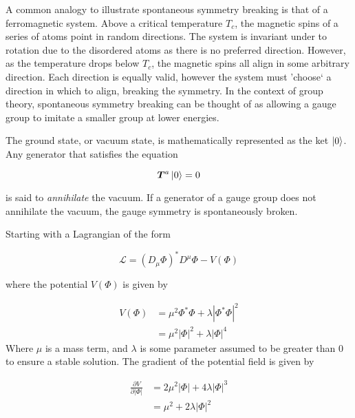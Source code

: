 \documentclass{article}
\begin{document}
A common analogy to illustrate spontaneous symmetry breaking is that of a ferromagnetic system. Above a critical temperature $T_c$, the magnetic spins of a series of atoms point in random directions. The system is invariant under to rotation due to the disordered atoms as there is no preferred direction. However, as the temperature drops below $T_c$, the magnetic spins all align in some arbitrary direction. Each direction is equally valid, however the system must 'choose` a direction in which to align, breaking the symmetry. In the context of group theory, spontaneous symmetry breaking can be thought of as allowing a gauge group to imitate a smaller group at lower energies.

The ground state, or vacuum state, is mathematically represented as the ket $\ket{0}$. Any generator that satisfies the equation

\begin{equation}
\bm{T}^a\ket{0} = 0
\end{equation}

is said to \textit{annihilate} the vacuum. If a generator of a gauge group does not annihilate the vacuum, the gauge symmetry is spontaneously broken.

Starting with a Lagrangian of the form

\begin{equation}
\label{eqn:ssbLagr}
\mathcal{L} = (D_\mu \Phi)^* D^\mu \Phi - V(\Phi)
\end{equation}

where the potential $V(\Phi)$ is given by

\begin{equation}
\begin{split}
V(\Phi) & = \mu^2 \Phi^*\Phi + \lambda|\Phi^*\Phi|^2 \\
& = \mu^2 |\Phi|^2 + \lambda|\Phi|^4
\end{split}
\end{equation}
Where $\mu$ is a mass term, and $\lambda$ is some parameter assumed to be greater than 0 to ensure a stable solution.
The gradient of the potential field is given by

\begin{equation}
\begin{split}
\frac{\partial V}{\partial |\Phi|} & = 2\mu^2|\Phi| + 4\lambda|\Phi|^3 \\
& = \mu^2 + 2\lambda|\Phi|^2
\end{split}
\end{equation}
\end{document}
